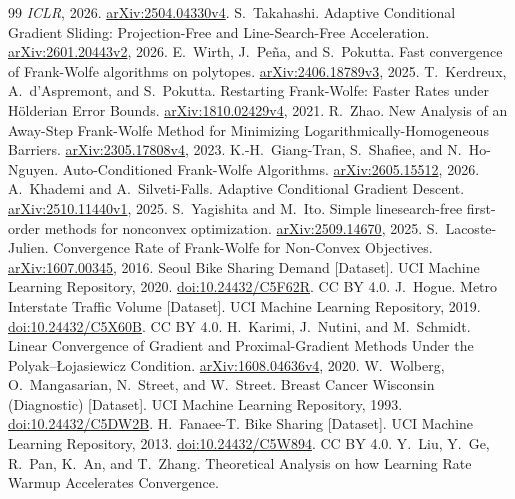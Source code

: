 \begin{thebibliography}{99}
\emph{ICLR}, 2026.
\href{https://arxiv.org/abs/2504.04330v4}{arXiv:2504.04330v4}.
 S.~Takahashi.
Adaptive Conditional Gradient Sliding: Projection-Free and Line-Search-Free Acceleration.
\href{https://arxiv.org/abs/2601.20443v2}{arXiv:2601.20443v2}, 2026.
 E.~Wirth, J.~Pe\~na, and S.~Pokutta.
Fast convergence of Frank-Wolfe algorithms on polytopes.
\href{https://arxiv.org/abs/2406.18789v3}{arXiv:2406.18789v3}, 2025.
 T.~Kerdreux, A.~d'Aspremont, and S.~Pokutta.
Restarting Frank-Wolfe: Faster Rates under H\"olderian Error Bounds.
\href{https://arxiv.org/abs/1810.02429v4}{arXiv:1810.02429v4}, 2021.
 R.~Zhao.
New Analysis of an Away-Step Frank-Wolfe Method for Minimizing
Logarithmically-Homogeneous Barriers.
\href{https://arxiv.org/html/2305.17808v4}{arXiv:2305.17808v4}, 2023.
 K.-H.~Giang-Tran, S.~Shafiee, and N.~Ho-Nguyen.
Auto-Conditioned Frank-Wolfe Algorithms.
\href{https://arxiv.org/abs/2605.15512}{arXiv:2605.15512}, 2026.
 A.~Khademi and A.~Silveti-Falls.
Adaptive Conditional Gradient Descent.
\href{https://arxiv.org/abs/2510.11440v1}{arXiv:2510.11440v1}, 2025.
 S.~Yagishita and M.~Ito.
Simple linesearch-free first-order methods for nonconvex optimization.
\href{https://arxiv.org/abs/2509.14670}{arXiv:2509.14670}, 2025.
 S.~Lacoste-Julien.
Convergence Rate of Frank-Wolfe for Non-Convex Objectives.
\href{https://arxiv.org/abs/1607.00345}{arXiv:1607.00345}, 2016.
 Seoul Bike Sharing Demand [Dataset].
UCI Machine Learning Repository, 2020.
\href{https://doi.org/10.24432/C5F62R}{doi:10.24432/C5F62R}. CC BY 4.0.
 J.~Hogue. Metro Interstate Traffic Volume [Dataset].
UCI Machine Learning Repository, 2019.
\href{https://doi.org/10.24432/C5X60B}{doi:10.24432/C5X60B}. CC BY 4.0.
 H.~Karimi, J.~Nutini, and M.~Schmidt.
Linear Convergence of Gradient and Proximal-Gradient Methods Under the
Polyak--{\L}ojasiewicz Condition.
\href{https://arxiv.org/abs/1608.04636v4}{arXiv:1608.04636v4}, 2020.
 W.~Wolberg, O.~Mangasarian, N.~Street, and W.~Street.
Breast Cancer Wisconsin (Diagnostic) [Dataset]. UCI Machine Learning Repository, 1993.
\href{https://doi.org/10.24432/C5DW2B}{doi:10.24432/C5DW2B}.
 H.~Fanaee-T. Bike Sharing [Dataset]. UCI Machine Learning Repository, 2013.
\href{https://doi.org/10.24432/C5W894}{doi:10.24432/C5W894}. CC BY 4.0.
 Y.~Liu, Y.~Ge, R.~Pan, K.~An, and T.~Zhang.
Theoretical Analysis on how Learning Rate Warmup Accelerates Convergence.

\end{thebibliography}
